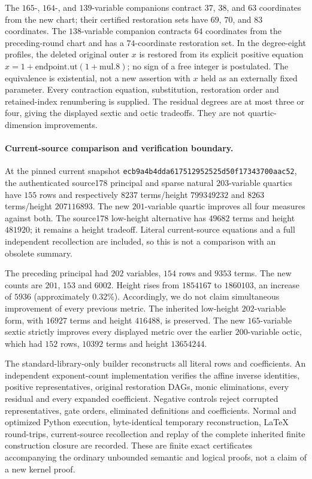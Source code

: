 The $165$-, $164$-, and $139$-variable companions contract $37$, $38$, and
$63$ coordinates from the new chart; their certified restoration sets have
$69$, $70$, and $83$ coordinates. The $138$-variable companion contracts
$64$ coordinates from the preceding-round chart and has a $74$-coordinate
restoration set. In the degree-eight profiles, the deleted original outer
$x$ is restored from its explicit positive equation
$x=1+\mathrm{endpoint.ut}(1+\mathrm{mul.8})$; no sign of a free integer
is postulated. The equivalence is existential, not a new assertion with
$x$ held as an externally fixed parameter. Every contraction equation,
substitution, restoration order and retained-index renumbering is supplied.
The residual degrees are at most three or four, giving the displayed
sextic and octic tradeoffs. They are not quartic-dimension improvements.

\paragraph{Current-source comparison and verification boundary.}
At the pinned current snapshot
\texttt{ecb9a4b4dda617512952525d50f17343700aac52}, the authenticated
source178 principal and sparse natural $203$-variable quartics have
$155$ rows and respectively $8237$ terms/height $799349232$ and
$8263$ terms/height $207116893$. The new $201$-variable quartic improves
all four measures against both. The source178 low-height alternative
has $49682$ terms and height $481920$; it remains a height tradeoff.
Literal current-source equations and a full independent recollection are
included, so this is not a comparison with an obsolete summary.

The preceding principal had $202$ variables, $154$ rows and $9353$ terms.
The new counts are $201$, $153$ and $6002$. Height rises from $1854167$ to
$1860103$, an increase of $5936$ (approximately $0.32\%$). Accordingly,
we do not claim simultaneous improvement of every previous metric.
The inherited low-height $202$-variable form, with $16927$ terms and
height $416488$, is preserved. The new $165$-variable sextic strictly
improves every displayed metric over the earlier $200$-variable octic, which
had $152$ rows, $10392$ terms and height $13654244$.

The standard-library-only builder reconstructs all literal rows and
coefficients. An independent exponent-count implementation verifies the
affine inverse identities, positive representatives, original restoration
DAGs, monic eliminations, every residual and every expanded coefficient.
Negative controls reject corrupted representatives, gate orders, eliminated
definitions and coefficients. Normal and optimized Python execution,
byte-identical temporary reconstruction, LaTeX round-trips, current-source
recollection and replay of the complete inherited finite construction closure
are recorded. These are finite exact certificates accompanying the ordinary
unbounded semantic and logical proofs, not a claim of a new kernel proof.
